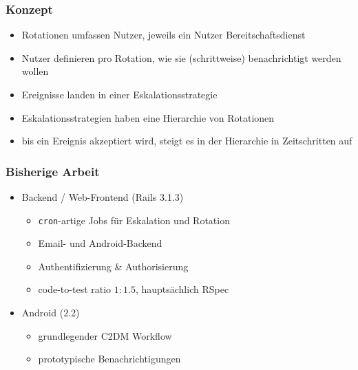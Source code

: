\documentclass[10pt]{beamer}
\begin{document}
\begin{frame}[c]
  \frametitle{Konzept}
  \begin{itemize}
    \item Rotationen umfassen Nutzer, jeweils ein Nutzer Bereitschaftsdienst
    \item Nutzer definieren pro Rotation, wie sie (schrittweise) benachrichtigt werden wollen
    \item Ereignisse landen in einer Eskalationsstrategie
    \item Eskalationsstrategien haben eine Hierarchie von Rotationen
    \item bis ein Ereignis akzeptiert wird, steigt es in der Hierarchie in Zeitschritten auf
  \end{itemize}
\end{frame}

\begin{frame}[c]
  \frametitle{Bisherige Arbeit}
  \begin{itemize}
    \item Backend / Web-Frontend (Rails 3.1.3)\nocite{railsguides}
    \begin{itemize}
      \item \texttt{cron}-artige Jobs für Eskalation und Rotation
      \item Email- und Android-Backend
      \item Authentifizierung \& Authorisierung
      \item code-to-test ratio $1:1.5$, hauptsächlich RSpec\nocite{rspec}\nocite{shoulda}\nocite{factorygirl}
    \end{itemize}
    \item Android (2.2)\nocite{androiddev}
    \begin{itemize}
      \item grundlegender C2DM Workflow
      \item prototypische Benachrichtigungen
    \end{itemize}
  \end{itemize}
\end{frame}
\end{document}
